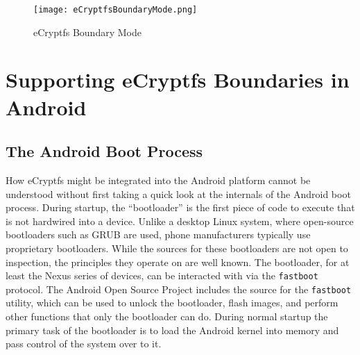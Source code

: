 \begin{figure}[!htb] 
\begin{center}
\texttt{[image: eCryptfsBoundaryMode.png]}\end{center}
\caption{eCryptfs Boundary Mode} \label{fig:ecryptfsboundary} \end{figure}

\section{Supporting eCryptfs Boundaries in Android}

\subsection{The Android Boot Process} How eCryptfs might be integrated into the Android platform cannot be understood without first
taking a quick look at the internals of the Android boot process. During startup, the ``bootloader'' is the first piece of code to
execute that is not hardwired into a device. Unlike a desktop Linux system, where open-source bootloaders such as GRUB are used,
phone manufacturers typically use proprietary bootloaders. While the sources for these bootloaders are not open to inspection, the
principles they operate on are well known. The bootloader, for at least the Nexus series of devices, can be interacted with via the
\texttt{fastboot} protocol. The Android Open Source Project includes the source for the \texttt{fastboot} utility, which can be used
to unlock the bootloader, flash images, and perform other functions that only the bootloader can do.  During normal startup the
primary task of the bootloader is to load the Android kernel into memory and pass control of the system over to it. 

